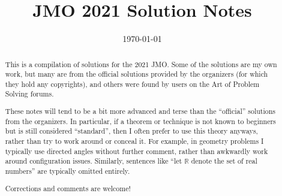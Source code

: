 \documentclass[11pt]{scrartcl}
\title{JMO 2021 Solution Notes}
\date{\today}
\begin{document}
\maketitle

\begin{abstract}
This is a compilation of solutions
for the 2021 JMO.
Some of the solutions are my own work,
but many are from the official solutions provided by the organizers
(for which they hold any copyrights),
and others were found by users on the Art of Problem Solving forums.

These notes will tend to be a bit more advanced and terse than the ``official''
solutions from the organizers.
In particular, if a theorem or technique is not known to beginners
but is still considered ``standard'', then I often prefer to
use this theory anyways, rather than try to work around or conceal it.
For example, in geometry problems I typically use directed angles
without further comment, rather than awkwardly work around configuration issues.
Similarly, sentences like ``let $\mathbb{R}$ denote the set of real numbers''
are typically omitted entirely.

Corrections and comments are welcome!
\end{abstract}

\tableofcontents
\newpage

\addtocounter{section}{-1}
\end{document}
